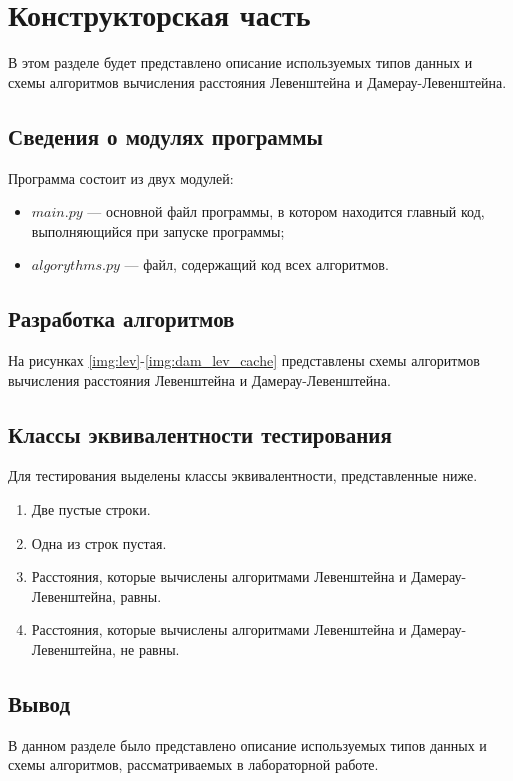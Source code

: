 \chapter{Конструкторская часть}
В этом разделе будет представлено описание используемых типов данных и схемы алгоритмов вычисления расстояния Левенштейна и Дамерау-Левенштейна.


\section{Сведения о модулях программы}
Программа состоит из двух модулей:
\begin{itemize}
	\item $main.py$ --- основной файл программы, в котором находится главный код, выполняющийся при запуске программы;
    \item $algorythms.py$ --- файл, содержащий код всех алгоритмов. \newline
\end{itemize}


\section{Разработка алгоритмов}
На рисунках \ref{img:lev}-\ref{img:dam_lev_cache} представлены схемы алгоритмов вычисления расстояния Левенштейна и Дамерау-Левенштейна.


\clearpage

\section{Классы эквивалентности тестирования}

Для тестирования выделены классы эквивалентности, представленные ниже.

\begin{enumerate}[label=\arabic*)]
    \item Две пустые строки.
    \item Одна из строк пустая.
    \item Расстояния, которые вычислены алгоритмами Левенштейна и Дамерау-Левенштейна, равны.
    \item Расстояния, которые вычислены алгоритмами Левенштейна и Дамерау-Левенштейна, не равны.
\end{enumerate}


\section{Вывод}
В данном разделе было представлено описание используемых типов данных и схемы алгоритмов, рассматриваемых в лабораторной работе.